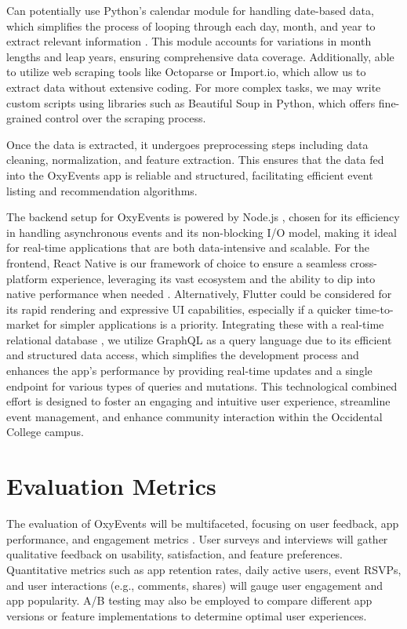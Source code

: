 \documentclass[10pt,twocolumn]{article}
\begin{document}
Can potentially use Python’s calendar module for handling date-based data, which simplifies the process of looping through each day, month, and year to extract relevant information \cite{PythonScrape}. This module accounts for variations in month lengths and leap years, ensuring comprehensive data coverage. Additionally, able to utilize web scraping tools like Octoparse or Import.io, which allow us to extract data without extensive coding\cite{MediumWebScraping101}. For more complex tasks, we may write custom scripts using libraries such as Beautiful Soup in Python\cite{PromptCloud}, which offers fine-grained control over the scraping process.

Once the data is extracted, it undergoes preprocessing steps including data cleaning, normalization, and feature extraction. This ensures that the data fed into the OxyEvents app is reliable and structured, facilitating efficient event listing and recommendation algorithms.
 

The backend setup for OxyEvents is powered by Node.js \cite{Node}, chosen for its efficiency in handling asynchronous events and its non-blocking I/O model, making it ideal for real-time applications that are both data-intensive and scalable. For the frontend, React Native is our framework of choice to ensure a seamless cross-platform experience, leveraging its vast ecosystem and the ability to dip into native performance when needed \cite{ReactNative}. Alternatively, Flutter could be considered for its rapid rendering and expressive UI capabilities, especially if a quicker time-to-market for simpler applications is a priority\cite{FluttervsReact}. Integrating these with a real-time relational database , we utilize GraphQL \cite{GraphQL} as a query language due to its efficient and structured data access, which simplifies the development process and enhances the app’s performance by providing real-time updates and a single endpoint for various types of queries and mutations. This technological combined effort is designed to foster an engaging and intuitive user experience, streamline event management, and enhance community interaction within the Occidental College campus.

\section{Evaluation Metrics}
The evaluation of OxyEvents will be multifaceted, focusing on user feedback, app performance, and engagement metrics \cite{UXMetric}. User surveys and interviews will gather qualitative feedback on usability, satisfaction, and feature preferences. Quantitative metrics such as app retention rates, daily active users, event RSVPs, and user interactions (e.g., comments, shares) will gauge user engagement and app popularity. A/B testing may also be employed to compare different app versions or feature implementations to determine optimal user experiences.
\end{document}
